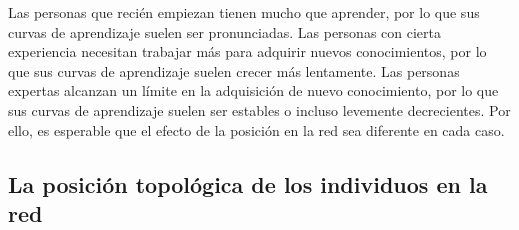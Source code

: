 \documentclass[a4paper,11pt]{book}
\theoremstyle{definition}
\begin{document}

Las personas que reci\'en empiezan tienen mucho que aprender, por lo que sus curvas de aprendizaje suelen ser pronunciadas.
%
Las personas con cierta experiencia necesitan trabajar m\'as para adquirir nuevos conocimientos, por lo que sus curvas de aprendizaje suelen crecer m\'as lentamente.
%
Las personas expertas alcanzan un l\'imite en la adquisici\'on de nuevo conocimiento, por lo que sus curvas de aprendizaje suelen ser estables o incluso levemente decrecientes.
%
Por ello, es esperable que el efecto de la posici\'on en la red sea diferente en cada caso.



\subsection{La posici\'on topol\'ogica de los individuos en la red} \label{sec:results_centralities}
\end{document}
